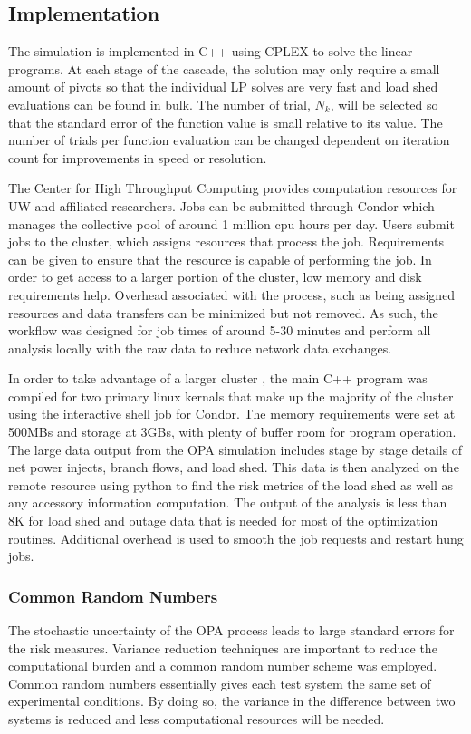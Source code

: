 \subsection*{Implementation}
The simulation is implemented in C++ using CPLEX to solve the linear programs.  At each stage of the cascade, the solution may only require a small amount of pivots so that the individual LP solves are very fast and load shed evaluations can be found in bulk.  The number of trial, $N_k$, will be selected so that the standard error of the function value is small relative to its value.  The number of trials per function evaluation can be changed dependent on iteration count for improvements in speed or resolution.

The Center for High Throughput Computing provides computation resources for UW and affiliated researchers.  Jobs can be submitted through Condor \cite{beowulfbook-condor} which manages the collective pool of around 1 million cpu hours per day.  Users submit jobs to the cluster, which assigns resources that process the job.  Requirements can be given to ensure that the resource is capable of performing the job.  In order to get access to a larger portion of the cluster, low memory and disk requirements help.  Overhead associated with the process, such as being assigned resources and data transfers can be minimized but not removed. As such, the workflow was designed for job times of around 5-30 minutes and perform all analysis locally with the raw data to reduce network data exchanges.

In order to take advantage of a larger cluster \cite{condor_flock}, the main C++ program was compiled for two primary linux kernals that make up the majority of the cluster using the interactive shell job for Condor.  The memory requirements were set at 500MBs and storage at 3GBs, with plenty of buffer room for program operation.  The large data output from the OPA simulation includes stage by stage details of net power injects, branch flows, and load shed.  This data is then analyzed on the remote resource using python to find the risk metrics of the load shed as well as any accessory information computation.  The output of the analysis is less than 8K for load shed and outage data that is needed for most of the optimization routines.  Additional overhead is used to smooth the job requests and restart hung jobs. 

\subsubsection*{Common Random Numbers}
The stochastic uncertainty of the OPA process leads to large standard errors for the risk measures.  Variance reduction techniques are important to reduce the computational burden and a common random number scheme was employed.  Common random numbers essentially gives each test system the same set of experimental conditions.  By doing so, the variance in the difference between two systems is reduced and less computational resources will be needed. \cite{law_2007}

